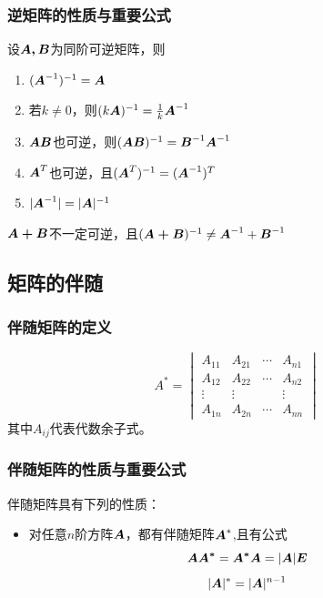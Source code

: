 \documentclass[12pt, a4paper, oneside, UTF8]{ctexbook}
\begin{document}
\subsubsection{逆矩阵的性质与重要公式}
设$\boldsymbol{A, B}$为同阶可逆矩阵，则
\begin{enumerate}[leftmargin=4em]
    \item $(\boldsymbol{A}^{-1})^{-1}=\boldsymbol{A}$
    \item 若$k\neq0$，则$(k\boldsymbol{A})^{-1}=\frac{1}{k} \boldsymbol{A}^{-1}$
    \item $\boldsymbol{AB}$也可逆，则$(\boldsymbol{AB})^{-1}=\boldsymbol{B}^{-1}\boldsymbol{A}^{-1}$
    \item $\boldsymbol{A}^T$也可逆，且$(\boldsymbol{A}^T)^{-1}=(\boldsymbol{A}^{-1})^{T}$
    \item $|\boldsymbol{A}^{-1}|=|\boldsymbol{A}|^{-1}$
\end{enumerate}
\begin{rmk}
    $\boldsymbol{A+B}$不一定可逆，且$(\boldsymbol{A+B})^{-1}\neq\boldsymbol{A}^{-1}+\boldsymbol{B}^{-1}$
\end{rmk}
\subsection{矩阵的伴随}
\subsubsection{伴随矩阵的定义}
\begin{defn}{}{}
    \[
        A^*=\begin{vmatrix}
            A_{11} & A_{21} & \cdots & A_{n1}\\
            A_{12} & A_{22} &  \cdots & A_{n2}\\
            \vdots & \vdots &  & \vdots\\
            A_{1n} & A_{2n} & \cdots & A_{nn}
        \end{vmatrix}
    \]
    其中$A_{ij}$代表代数余子式。
\end{defn}
\subsubsection{伴随矩阵的性质与重要公式}
伴随矩阵具有下列的性质：
\begin{itemize}[leftmargin=4em]
    \item 对任意$n$阶方阵$\boldsymbol{A}$，都有伴随矩阵$\boldsymbol{A}^*$,且有公式\[\boldsymbol{AA^*}=\boldsymbol{A^*A}=|\boldsymbol{A}|\boldsymbol{E}\]\[|\boldsymbol{A}|^*=|\boldsymbol{A}|^{n-1}\]
\end{itemize}
\end{document}
